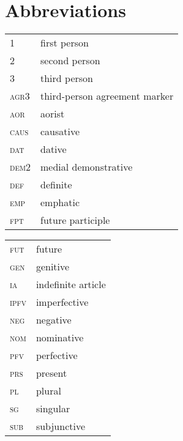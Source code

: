 \documentclass[output=paper,colorlinks,citecolor=brown,draftmode]{langscibook}
\begin{document}
\section*{Abbreviations}
\begin{tabularx}{.55\textwidth}{@{}lQ@{}}
1 & first person \\
2 & second person \\
3 & third person \\
\textsc{agr3} & third-person agreement marker \\
\textsc{aor} & aorist \\
\textsc{caus} & causative \\
\textsc{dat} & dative \\
\textsc{dem2} & medial demonstrative \\
\textsc{def} & definite \\
\textsc{emp} & emphatic \\
\textsc{fpt} & future participle \\
\end{tabularx}%
\begin{tabularx}{.4\textwidth}{@{}lQ@{}}
\textsc{fut} & future \\
\textsc{gen} & genitive \\
\textsc{ia} & indefinite article \\
\textsc{ipfv} & imperfective \\
\textsc{neg} & negative \\
\textsc{nom} & nominative \\
\textsc{pfv} & perfective \\
\textsc{prs} & present \\
\textsc{pl} & plural \\
\textsc{sg} & singular \\
\textsc{sub} & subjunctive \\
\end{tabularx}




\sloppy
\printbibliography[heading=subbibliography,notkeyword=this]
\end{document}
